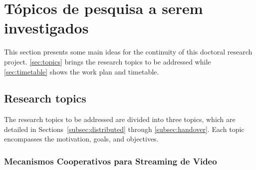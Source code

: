 \clearpage
\section{Tópicos de pesquisa a serem investigados}
\label{ch:proposal}

This section presents some main ideas for the continuity of this doctoral
research project. \autoref{sec:topics} brings the research topics to be
addressed while \autoref{sec:timetable} shows the work plan and timetable.

\subsection{Research topics}
\label{sec:topics}


The research topics to be addressed are divided into three topics, which are
detailed in Sections~\ref{subsec:distributed} through \ref{subsec:handover}.
Each topic encompasses the motivation, goals, and objectives.

\subsubsection{Mecanismos Cooperativos para Streaming de Video}
\label{subsec:video-streaming}


